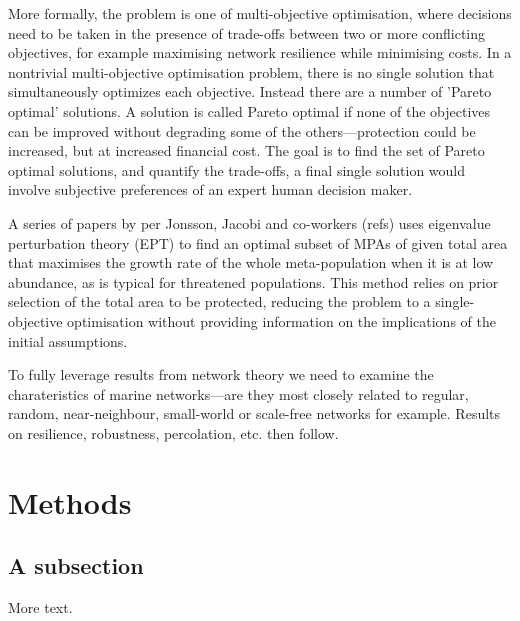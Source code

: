 \documentclass[11pt]{article} %
\begin{document}
More formally, the problem is one of multi-objective optimisation, where decisions need to be taken in the presence of trade-offs between two or more conflicting objectives, for example maximising network resilience while minimising costs. In a nontrivial multi-objective optimisation problem, there is no single solution that simultaneously optimizes each objective. Instead there are a number of 'Pareto optimal' solutions. A solution is called Pareto optimal if none of the objectives can be improved without degrading some of the others---protection could be increased, but at increased financial cost. The goal is to find the set of Pareto optimal solutions, and quantify the trade-offs, a final single solution would involve subjective preferences of an expert human decision maker.

A series of papers by per Jonsson, Jacobi and co-workers (refs) uses eigenvalue perturbation theory (EPT) to find an optimal subset of MPAs of given total area that maximises the growth rate of the whole meta-population when it is at low abundance, as is typical for threatened populations. This method relies on prior selection of the total area to be protected, reducing the problem to a single-objective optimisation without providing information on the implications of the initial assumptions. 

To fully leverage results from network theory we need to examine the charateristics of marine networks---are they most closely related to regular, random, near-neighbour, small-world or scale-free networks for example. Results on resilience, robustness, percolation, etc. then follow.




\section{Methods}


\subsection{A subsection}

More text.
\end{document}

